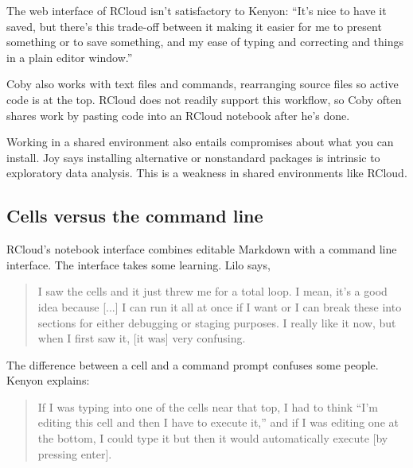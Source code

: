 The web interface of RCloud isn't satisfactory to Kenyon: ``It's nice to have
it saved, but there's this trade-off between it making it easier for me to
present something or to save something, and my ease of typing and
correcting and things in a plain editor window.''

Coby also works with text files and commands, rearranging source files
so active code is at the top. RCloud does not readily support this
workflow, so Coby often shares work by pasting code into an RCloud
notebook after he's done.


Working in a shared environment also entails compromises about what you can
install. Joy says installing alternative or nonstandard packages is
intrinsic to exploratory data analysis. This is a weakness in shared
environments like RCloud.

\subsection{Cells versus the command line}
RCloud's notebook interface combines editable Markdown with a command line
interface.
The interface takes some learning. Lilo says,
\begin{quote}
I saw the cells and it just threw me
for a total loop. I mean, it's a good idea because [...] I can run it all at
once if I want or I can break these into sections for either debugging or
staging purposes. I really like it now, but when I first saw it, [it was] very
confusing.
\end{quote}

The difference between a cell and a command prompt confuses some people.
Kenyon explains:
\begin{quote}
If I was typing into one of the cells near that top, I had to think ``I'm editing
this cell and then I have to execute it,'' and if I was editing one at the bottom,
I could type it but then it would automatically execute [by pressing enter].
\end{quote}


